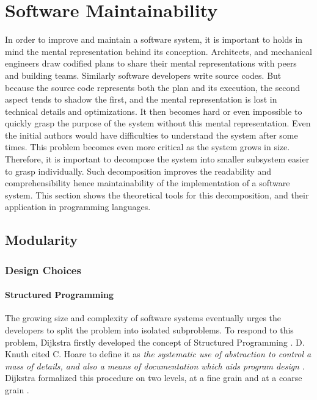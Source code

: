 \section{Software Maintainability} \label{chapter3:software-maintainability}

In order to improve and maintain a software system, it is important to holds in mind the mental representation behind its conception.
Architects, and mechanical engineers draw codified plans to share their mental representations with peers and building teams.
Similarly software developers write source codes.
But because the source code represents both the plan and its execution, the second aspect tends to shadow the first, and the mental representation is lost in technical details and optimizations.
It then becomes hard or even impossible to quickly grasp the purpose of the system without this mental representation.
Even the initial authors would have difficulties to understand the system after some times.
This problem becomes even more critical as the system grows in size.
Therefore, it is important to decompose the system into smaller subsystem easier to grasp individually.
Such decomposition improves the readability and comprehensibility hence maintainability of the implementation of a software system.
This section shows the theoretical tools for this decomposition, and their application in programming languages.


\subsection{Modularity}


\subsubsection{Design Choices}


\paragraph{Structured Programming}


The growing size and complexity of software systems eventually urges the developers to split the problem into isolated subproblems.
To respond to this problem, Dijkstra firstly developed the concept of Structured Programming \cite{Dijkstra1970}.
D. Knuth cited C. Hoare to define it as \textit{the systematic use of abstraction to control a mass of details, and also a means of documentation which aids program design} \cite{Knuth1974}.
Dijkstra formalized this procedure on two levels, at a fine grain and at a coarse grain \cite{Dijkstra1968a,Dijkstra1968}.


